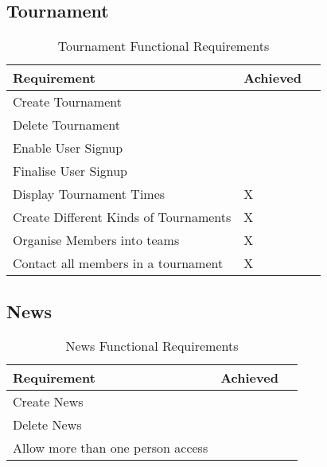 \subsection{Tournament}
\begin{table}[H]
\begin{center}
    \begin{tabular}{| l | l | p{1cm} |}
    \hline
    Requirement & Achieved\\ \hline
	Create Tournament & \checkmark \\ \hline
	Delete Tournament & \checkmark \\ \hline
	Enable User Signup	& \checkmark \\ \hline
	Finalise User Signup	& \checkmark \\ \hline
	Display Tournament Times& X \\ \hline
	Create Different Kinds of Tournaments & X \\ \hline
	Organise Members into teams & X \\ \hline
	Contact all members in a tournament & X \\ \hline
	\end{tabular}
\end{center}
\caption{Tournament Functional Requirements}
\end{table}


\subsection{News}
\begin{table}[H]
\begin{center}
    \begin{tabular}{| l | l | p{1cm} |}
    \hline
    Requirement & Achieved\\ \hline
	Create News & \checkmark \\ \hline
	Delete News & \checkmark \\ \hline
	Allow more than one person access & \checkmark \\ \hline
	\end{tabular}
\end{center}
\caption{News Functional Requirements}
\end{table}


